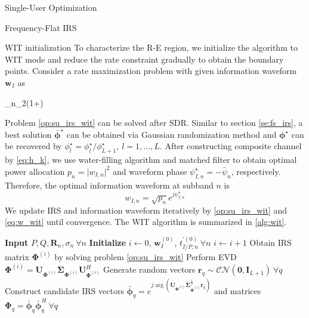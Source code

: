 \documentclass{IEEEtran}
\begin{document}
\begin{section}{Single-User Optimization}
\begin{subsection}{Frequency-Flat IRS}
		\begin{subsection}{WIT initialization}
			To characterize the R-E region, we initialize the algorithm to WIT mode and reduce the rate constraint gradually to obtain the boundary points. Consider a rate maximization problem with given information waveform $\boldsymbol{w}_I$ as
			\begin{maxi!}
				{\boldsymbol{\Phi}}{\sum_{n}{\log_2\left(1+\right)}}{\label{op:su_irs_wit}}{}
			\end{maxi!}
			Problem \ref{op:su_irs_wit} can be solved after SDR. Similar to section \ref{se:fs_irs}, a best solution $\bar{\boldsymbol{\phi}}^\star$ can be obtained via Gaussian randomization method and $\boldsymbol{\phi}^\star$ can be recovered by $\phi_l^\star=\phi_l^\star/\phi_{L+1}^\star, \ l=1,\dots,L$. After constructing composite channel by \ref{eq:h_k}, we use water-filling algorithm and matched filter to obtain optimal power allocation $p_n=\lvert w_{I,n} \rvert^2$ and waveform phase $\psi_{I,n}^\star=-\bar{\psi}_n$, respectively. Therefore, the optimal information waveform at subband $n$ is
			\begin{equation}\label{eq:w_wit}
				w_{I,n}=\sqrt{p_n}e^{j \psi_{I,n}^\star}
			\end{equation}
			We update IRS and information waveform iteratively by \ref{op:su_irs_wit} and \ref{eq:w_wit} until convergence. The WIT algorithm is summarized in \ref{alg:wit}.
			\begin{algorithm}
				\caption{WIT Initialization}
				\label{alg:wit}
				\begin{algorithmic}[1]
					\State \textbf{Input} $P, Q, \boldsymbol{R}_n, \sigma_n \ \forall n$
					\State \textbf{Initialize} $i \leftarrow 0$, $\boldsymbol{w}_I^{(0)}$, $t_{I/P,n}^{\prime (0)} \ \forall n$
					\Repeat
					\State $i \leftarrow i + 1$
					\State Obtain IRS matrix $\boldsymbol{\Phi}^{(i)}$ by solving problem \ref{op:su_irs_wit}
					\State Perform EVD $\boldsymbol{\Phi}^{(i)}=\boldsymbol{U}_{\boldsymbol{\Phi}^{(i)}}\boldsymbol{\Sigma}_{\boldsymbol{\Phi}^{(i)}}\boldsymbol{U}_{\boldsymbol{\Phi}^{(i)}}^H$
					\State Generate random vectors $\boldsymbol{r}_q \sim \mathcal{CN}(\boldsymbol{0},\boldsymbol{I}_{L+1}) \ \forall q$
					\State Construct candidate IRS vectors $\bar{\boldsymbol{\phi}}_q=e^{j\arg\left(\boldsymbol{U}_{\boldsymbol{\Phi}^{(i)}}\boldsymbol{\Sigma}_{\boldsymbol{\Phi}^{(i)}}^{\frac{1}{2}}\boldsymbol{r}_q\right)}$ and matrices $\boldsymbol{\Phi}_q=\bar{\boldsymbol{\phi}}_q\bar{\boldsymbol{\phi}}_q^H  \ \forall q$

\end{algorithmic}
\end{algorithm}
\end{subsection}
\end{subsection}
\end{section}
\end{document}
